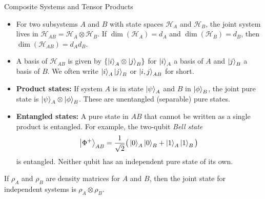 \begin{frame}{Composite Systems and Tensor Products}
  \begin{itemize}
    \item For two subsystems $A$ and $B$ with state spaces $\mathcal{H}_A$ and $\mathcal{H}_B$, the joint system lives in $\mathcal{H}_{AB} = \mathcal{H}_A \otimes \mathcal{H}_B$. If $\dim(\mathcal{H}_A)=d_A$ and $\dim(\mathcal{H}_B)=d_B$, then $\dim(\mathcal{H}_{AB}) = d_A d_B$.
    \item A basis of $\mathcal{H}_{AB}$ is given by $\{\ket{i}_A \otimes \ket{j}_B\}$ for $\ket{i}_A$ a basis of $A$ and $\ket{j}_B$ a basis of $B$. We often write $\ket{i}_A\ket{j}_B$ or $\ket{i,j}_{AB}$ for short.
    \item \textbf{Product states:} If system $A$ is in state $\ket{\psi}_A$ and $B$ in $\ket{\phi}_B$, the joint pure state is $\ket{\psi}_A \otimes \ket{\phi}_B$. These are unentangled (separable) pure states.
    \item \textbf{Entangled states:} A pure state in $AB$ that cannot be written as a single product is entangled. For example, the two-qubit \emph{Bell state} 
      \[
         \ket{\Phi^+}_{AB} = \frac{1}{\sqrt{2}}\big(\ket{0}_A\ket{0}_B + \ket{1}_A\ket{1}_B\big)
      \] 
      is entangled. Neither qubit has an independent pure state of its own.
  \end{itemize}
  If $\rho_A$ and $\rho_B$ are density matrices for $A$ and $B$, then the joint state for independent systems is $\rho_{A}\otimes \rho_{B}$.
\end{frame}

